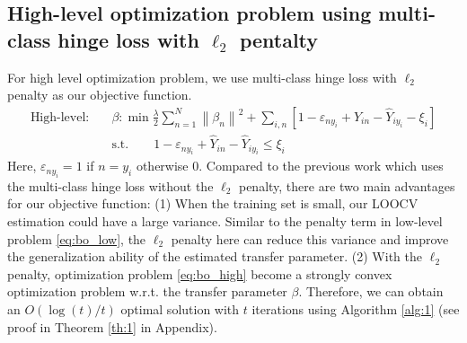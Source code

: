 \subsection{High-level optimization problem using multi-class hinge loss with $\ell_2$ pentalty} 
For high level optimization problem, we use multi-class hinge loss\cite{crammer2002algorithmic} with $\ell_2$ penalty as our objective function.
\begin{equation}\label{eq:bo_high}
\begin{aligned}
\text{High-level:}\quad&\beta: \min \frac{{{\lambda}}}{2}\sum\limits_{n = 1}^N {{{\left\| {{\beta _n}} \right\|}^2}}  + \sum\limits_{i,n}\left[ {1 - {\varepsilon _{n{y_i}}} + {{\hat Y}_{in}} - {{\hat Y}_{i{y_i}}} - {\xi _i}} \right]\\
&\text{s.t.} \qquad1 - {\varepsilon _{n{y_i}}} + {\hat Y_{in}} - {\hat Y_{i{y_i}}} \le {\xi_i}
\end{aligned}
\end{equation}
Here, $\varepsilon _{n{y_i}}=1$ if $n=y_i$ otherwise 0.
Compared to the previous work \cite{tommasi2014learning}\cite{kuzborskij2013n} which uses the multi-class hinge loss without the $\ell_2$ penalty, there are two main advantages for our objective function: (1) When the training set is small, our LOOCV estimation could have a large variance. Similar to the penalty term in low-level problem \eqref{eq:bo_low},  the $\ell_2$ penalty here can {reduce this variance and improve the generalization ability of the estimated transfer parameter}. (2) With the $\ell_2$ penalty, optimization problem \eqref{eq:bo_high} become a strongly convex optimization problem w.r.t. the transfer parameter $\beta$. Therefore, we can obtain an $O({\log(t)}/{t})$ optimal solution with $t$ iterations using Algorithm \ref{alg:1} (see proof in Theorem \ref{th:1} in Appendix).
 